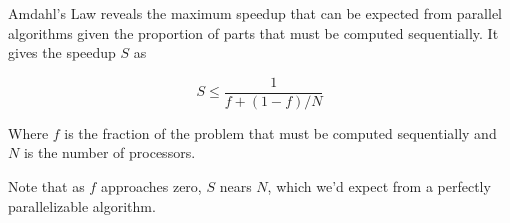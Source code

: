 \documentclass[12pt]{article}
\begin{document}
Amdahl's Law reveals the maximum speedup that can be expected from parallel algorithms given the proportion of parts that must be computed sequentially.  It gives the speedup $S$ as

$$ S \le \frac{1}{f+(1-f)/N}  $$

Where $f$ is the fraction of the problem that must be computed sequentially and $N$ is the number of processors.

Note that as $f$ approaches zero, $S$ nears $N$, which we'd expect from a perfectly parallelizable algorithm.

\end{document}
